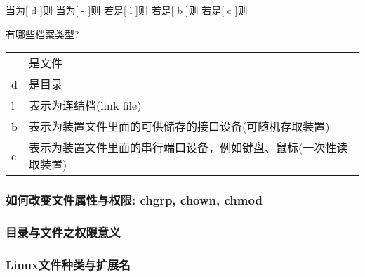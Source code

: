 \documentclass[11pt]{article}
\begin{document}
当为[ d ]则
当为[ - ]则
若是[ l ]则
若是[ b ]则
若是[ c ]则

有哪些档案类型?
\begin{center}
\begin{tabular}{ll}
- & 是文件\\
d & 是目录\\
l & 表示为连结档(link file)\\
b & 表示为装置文件里面的可供储存的接口设备(可随机存取装置)\\
c & 表示为装置文件里面的串行端口设备，例如键盘、鼠标(一次性读取装置)\\
\end{tabular}
\end{center}

\subsubsection{如何改变文件属性与权限: chgrp, chown, chmod}
\label{sec-1-2-2}

\subsubsection{目录与文件之权限意义}
\label{sec-1-2-3}

\subsubsection{Linux文件种类与扩展名}
\label{sec-1-2-4}
\end{document}
